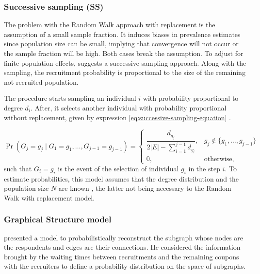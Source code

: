 \subsubsection{Successive sampling (SS)}

The problem with the Random Walk approach with replacement is the assumption
of a small sample fraction. It induces biases in prevalence estimates since
population size can be small, implying that convergence will not occur or the
sample fraction will be high. Both cases break the assumption. To adjust for finite population effects,
\textcite{gile2011improved} suggests a successive sampling approach. Along
with the sampling, the recruitment probability is proportional to the size of
the remaining not recruited population.  

The procedure starts sampling an individual $i$ with probability proportional to
degree $d_i$. After, it selects another individual with probability
proportional without replacement, given by expression \eqref{eq:successive-sampling-equation} \cite[p.
136]{gile2011improved}.

\begin{equation}
  \label{eq:successive-sampling-equation}
  \Pr(G_j = g_j \mid G_1 = g_1, \dots, G_{j-1} = g_{j-1}) = \begin{cases}
    \dfrac{d_{g_j}}{2|E| - \sum_{i=1}^{j-1} d_{g_i}}, &g_j \not\in \{g_1, \dots, g_{j-1}\} \\
    0, &\text{otherwise}, 
  \end{cases}
\end{equation}
such that $G_i = g_i$ is the event of the selection of individual $g_i$ in the
step $i$. To estimate probabilities, this model assumes that the degree distribution and the
population size $N$ are known \cite[Table 2, p. 144]{gile2011improved}, the
latter not being necessary to the Random Walk with replacement model. 

\subsubsection{Graphical Structure model}

\textcite{crawford2016} presented a model to probabilistically reconstruct the
subgraph whose nodes are the respondents and edges are their connections. He
considered the information brought by the waiting times between recruitments
and the remaining coupons with the recruiters to define a probability
distribution on the space of subgraphs. 

